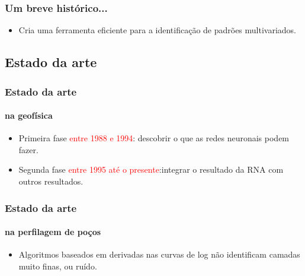 \documentclass[aspectratio=10]{beamer} %
\begin{document}
\begin{frame}
\frametitle{Um breve histórico...}
\begin{small}
\end{small}
\begin{itemize}
\item Cria uma ferramenta eficiente para a identificação de padrões multivariados.  
\end{itemize}
\end{frame}


\subsection{Estado da arte}

\begin{frame}
\frametitle{Estado da arte}
\framesubtitle{na geofísica}
\begin{itemize}
\item Primeira fase \textcolor{red}{entre 1988 e 1994}: descobrir o que as redes neuronais podem fazer. 
\pause
\item Segunda fase \textcolor{red}{entre 1995 até o presente}:integrar o resultado da RNA com outros resultados.
\end{itemize}

\begin{flushleft}
\citep{Poulton2002, Artero2009}
\end{flushleft}



\end{frame}

\begin{frame}
\frametitle{Estado da arte}
\framesubtitle{na perfilagem de poços}
\begin{small}
\end{small}
\begin{itemize}
\item Algoritmos baseados em derivadas nas curvas de log não identificam camadas muito finas, ou ruído.
\end{itemize}
\end{frame}
\end{document}
